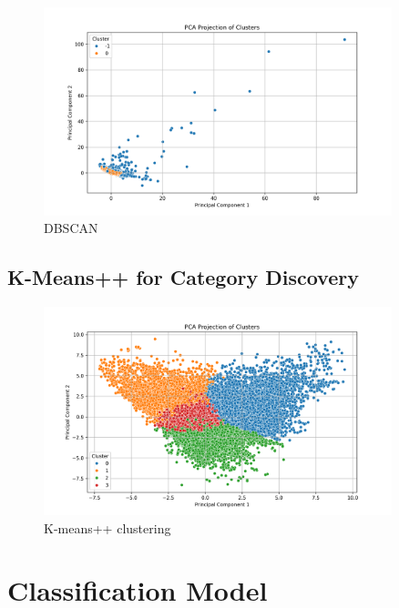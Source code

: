 \documentclass[a4paper,12pt,twoside]{scrreprt}
\begin{document}
\begin{figure}[htbp]
  \centering

  \includegraphics[width=0.9\textwidth]{Figures/dbscan_diagram_feature_data.png}
  \caption{DBSCAN}
  \label{fig:dbscan-clustering-outlier-removal}
\end{figure}
\FloatBarrier

\subsection{K-Means++ for Category Discovery}

\begin{figure}[htbp]
  \centering

  \includegraphics[width=0.9\textwidth]{Figures/kmeans_diagram_feature_data.png}
  \caption{K-means++ clustering}
  \label{fig:kmeans-clustering}
\end{figure}
\FloatBarrier

\section{Classification Model}
\end{document}
